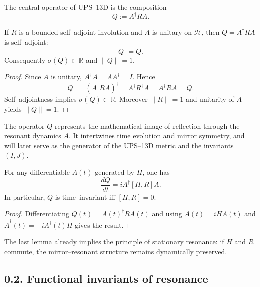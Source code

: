 \begin{definition}
The central operator of UPS–13D is the composition
\[
Q := A^\dagger R A.
\]
\end{definition}

\begin{theorem}
If $R$ is a bounded self–adjoint involution and $A$ is unitary on $\mathcal{H}$,
then $Q = A^\dagger R A$ is self–adjoint:
\[
Q^\dagger = Q.
\]
Consequently $\sigma(Q)\subset \mathbb{R}$ and $\|Q\| = 1$.
\end{theorem}

\begin{proof}
Since $A$ is unitary, $A^\dagger A = AA^\dagger = I$.
Hence
\[
Q^\dagger = (A^\dagger R A)^\dagger = A^\dagger R^\dagger A = A^\dagger R A = Q.
\]
Self–adjointness implies $\sigma(Q)\subset\mathbb{R}$.
Moreover $\|R\|=1$ and unitarity of $A$ yields $\|Q\|=1$.
\end{proof}

\begin{remark}
The operator $Q$ represents the mathematical image of reflection through the resonant dynamics $A$.
It intertwines time evolution and mirror symmetry,
and will later serve as the generator of the UPS–13D metric and the invariants $(I,J)$.
\end{remark}

\begin{lemma}
For any differentiable $A(t)$ generated by $H$, one has
\[
\frac{dQ}{dt} = i A^\dagger [H, R] A.
\]
In particular, $Q$ is time–invariant iff $[H,R]=0$.
\end{lemma}
\begin{proof}
Differentiating $Q(t)=A(t)^\dagger R A(t)$ and using
$\dot A(t) = iHA(t)$ and $\dot A^\dagger(t) = -iA^\dagger(t)H$ gives the result.
\end{proof}

\medskip
The last lemma already implies the principle of stationary resonance:
if $H$ and $R$ commute, the mirror–resonant structure remains dynamically preserved.

\subsection*{0.2. Functional invariants of resonance}

